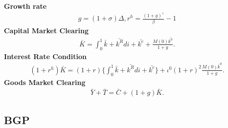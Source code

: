 \documentclass[a4paper,12pt]{article}
\begin{document}
\textbf{Growth rate}
\begin{align}
g = (1+\sigma) \Delta, r^h = \frac{(1+g)^\gamma }{\beta} - 1
\end{align}
\textbf{Capital Market Clearing}\\
\begin{align}
    \bar{K} = \int_0^1 \bar{k} + \bar{k^R} di + \bar{k^e} + \frac{M(0)\bar{k^0}}{1+g}.
\end{align}
\textbf{Interest Rate Condition}\\
\begin{align}
    (1+r^h)\bar{K} = (1+r)\Big\{\int_0^1 \bar{k}+ \bar{k^R} di + \bar{k^e} \Big\} + \iota^0(1+r)^2 \frac{M(0)\bar{k}^0}{1+g}.
\end{align}
\textbf{Goods Market Clearing}\\
\begin{align}
    \bar{Y} + \bar{T} = \bar{C} + (1+g)\bar{K}.
\end{align}



\subsection{BGP}
\end{document}

